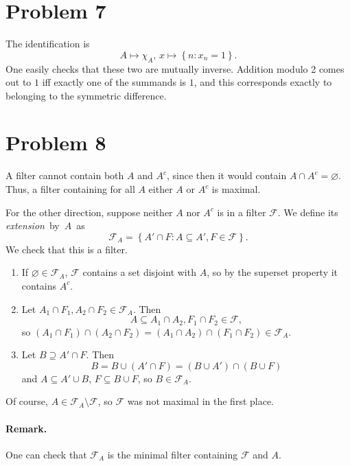 \section*{Problem 7}

The identification is
\[ 
    A \mapsto \chi_A,\, x \mapsto \left\{ n: x_n = 1 \right\}.
\]
One easily checks that these two are mutually inverse. Addition modulo 2 comes out to \( 1 \) iff exactly one of the summands is \( 1 \), and this corresponds exactly to belonging to the symmetric difference.

\section*{Problem 8}

A filter cannot contain both \( A \) and \( A^c \), since then it would contain \( A \cap A^c = \varnothing \). Thus, a filter containing for all \( A \) either \( A \) or \( A^c \) is maximal.

For the other direction, suppose neither \( A \) nor \( A^c \) is in a filter \( \mathcal{F} \). We define its \emph{extension}~by~\( A \)~as
\[ 
    \mathcal{F}_A = \left\{ A' \cap F : A \subseteq A', F \in \mathcal{F} \right\}.
\]
We check that this is a filter.
\begin{enumerate}
    \item If \( \varnothing \in \mathcal{F}_A \), \( \mathcal{F} \) contains a set disjoint with \( A \), so by the superset property it contains \( A^c \).
    \item Let \( A_1 \cap F_1, A_2 \cap F_2 \in \mathcal{F}_A \). Then
    \[ 
    A \subseteq A_1 \cap A_2, F_1 \cap F_2 \in \mathcal{F},
   \]
   so \( (A_1 \cap F_1) \cap (A_2 \cap F_2) = (A_1 \cap A_2) \cap (F_1 \cap F_2) \in \mathcal{F}_A \).
\item Let \( B \supseteq A' \cap F \). Then
    \[ 
       B = B \cup (A' \cap F) = (B \cup A') \cap (B \cup F)
   \]
   and \( A \subseteq A' \cup B \), \( F \subseteq B \cup F \), so \( B \in \mathcal{F}_A \).
\end{enumerate}
Of course, \( A \in \mathcal{F}_A \setminus \mathcal{F} \), so \( \mathcal{F} \) was not maximal in the first place.

\paragraph{Remark.} One can check that \( \mathcal{F}_A \) is the minimal filter containing \( \mathcal{F} \) and \( A \).

